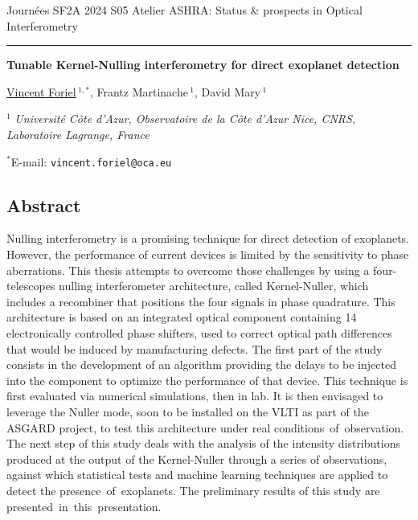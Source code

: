 \documentclass[12pt]{article}
\begin{document}
Journées SF2A 2024
\hfill
S05 Atelier ASHRA: Status \& prospects in Optical Interferometry

\smallskip
\hrule

\bigskip

\begin{center}
\LARGE \bf Tunable Kernel-Nulling interferometry for direct exoplanet detection\rm

\vspace{0.5cm}

\large  \underline{Vincent Foriel}$\,^{1,*}$, \large Frantz Martinache$\,^1$, \large David Mary$\,^1$

\vspace{0.5cm}

\normalsize

$^1$ \textit{Université Côte d’Azur, Observatoire de la Côte d’Azur Nice, CNRS, Laboratoire Lagrange, France}

\vspace{0.3cm}
$^*$E-mail: {\tt vincent.foriel@oca.eu}

\end{center}
\vspace{-0.8cm}
\subsection*{\Large Abstract}

Nulling interferometry is a promising technique for direct detection of exoplanets. However, the performance of current devices is limited by the sensitivity to phase aberrations. This thesis attempts to overcome those challenges by using a four-telescopes nulling interferometer architecture, called Kernel-Nuller\cite{Martinache et al. 2018}, which includes a recombiner that positions the four signals in phase quadrature. This architecture is based on an integrated optical component containing 14 electronically controlled phase shifters, used to correct optical path differences that would be induced by manufacturing defects. The first part of the study consists in the development of an algorithm providing   the delays to be injected into the component to optimize the performance of that device. This   technique is first evaluated via numerical simulations, then in lab. It is then envisaged to leverage the Nuller mode, soon to be installed on the VLTI as part of the ASGARD project, to test this architecture under real conditions of observation. The next step of this study deals with the analysis of the intensity distributions produced at the output of the Kernel-Nuller\cite{Martinache et al. 2018, Cvetojevic et al. 2022} through a series of observations, against which statistical tests and machine learning techniques are applied to detect the presence of exoplanets. The preliminary results of this study are presented in this presentation.
\end{document}
